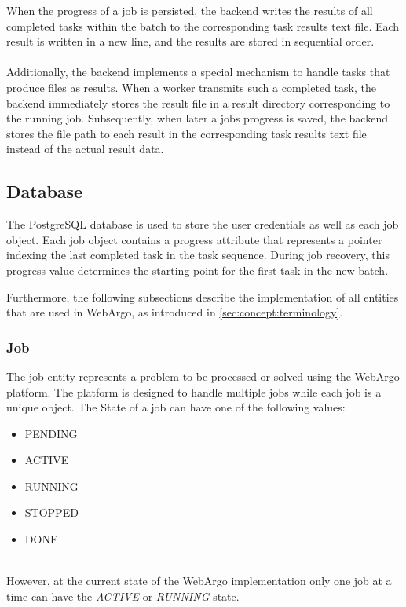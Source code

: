 When the progress of a job is persisted, the backend writes the results of all completed tasks within the batch to the corresponding task results text file. Each result is written in a new line, and the results are stored in sequential order.
\\~\\
Additionally, the backend implements a special mechanism to handle tasks that produce files as results. When a worker transmits such a completed task, the backend immediately stores the result file in a result directory corresponding to the running job. Subsequently, when later a jobs progress is saved, the backend stores the file path to each result in the corresponding task results text file instead of the actual result data.

\subsection{Database}
The PostgreSQL \cite{methodology:db} database is used to store the user credentials as well as each job object. Each job object contains a progress attribute that represents a pointer indexing the last completed task in the task sequence. During job recovery, this progress value determines the starting point for the first task in the new batch.

Furthermore, the following subsections describe the implementation of all entities that are used in WebArgo, as introduced in \autoref{sec:concept:terminology}.

\subsubsection{Job}
The job entity represents a problem to be processed or solved using the WebArgo platform. The platform is designed to handle multiple jobs while each job is a unique object. The State of a job can have one of the following values:
\begin{itemize}
  \item PENDING
  \item ACTIVE
  \item RUNNING
  \item STOPPED
  \item DONE
\end{itemize}
~\\
However, at the current state of the WebArgo implementation only one job at a time can have the \emph{ACTIVE} or \emph{RUNNING} state.

